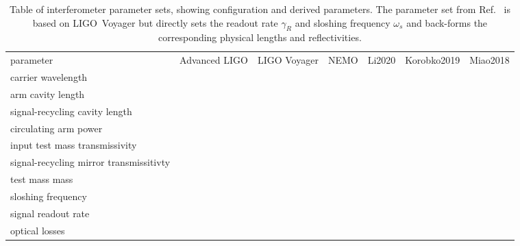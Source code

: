 \begin{table} %
\centering
\begin{tabular}{lllllll}
parameter & Advanced LIGO & LIGO Voyager & NEMO & Li2020 & Korobko2019 & Miao2018 \\
carrier wavelength &  &  &  &  &  &  \\
arm cavity length &  &  &  &  &  &  \\
signal-recycling cavity length &  &  &  &  &  &  \\
circulating arm power &  &  &  &  &  &  \\
input test mass transmissivity &  &  &  &  &  &  \\
signal-recycling mirror transmissitivty &  &  &  &  &  &  \\
test mass mass &  &  &  &  &  &  \\
sloshing frequency &  &  &  &  &  &  \\
signal readout rate &  &  &  &  &  &  \\
optical losses &  &  &  &  &  & 
\end{tabular}
    \caption{ Table of interferometer parameter sets, showing configuration and derived parameters. The parameter set from Ref.~\cite{} is based on LIGO~Voyager but directly sets the readout rate $\gamma_R$ and sloshing frequency $\omega_s$ and back-forms the corresponding physical lengths and reflectivities. }
    \label{tab:parameter_sets}
\end{table}

